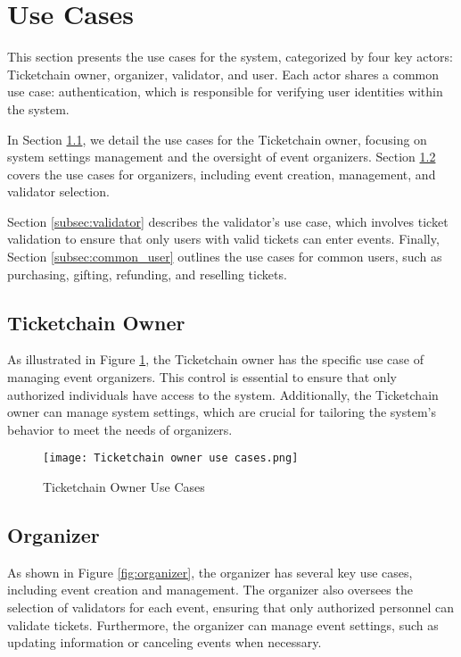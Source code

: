 \section{Use Cases}
\label{sec:use_cases}

This section presents the use cases for the system, categorized by four key
actors: Ticketchain owner, organizer, validator, and user. Each actor shares a
common use case: authentication, which is responsible for verifying user
identities within the system.

In Section \ref{subsec:ticketchain_owner}, we detail the use cases for the
Ticketchain owner, focusing on system settings management and the oversight of
event organizers. Section \ref{subsec:organizer} covers the use cases for
organizers, including event creation, management, and validator selection.

Section \ref{subsec:validator} describes the validator's use case, which
involves ticket validation to ensure that only users with valid tickets can
enter events. Finally, Section \ref{subsec:common_user} outlines the use cases for
common users, such as purchasing, gifting, refunding, and reselling tickets.

\subsection{Ticketchain Owner}
\label{subsec:ticketchain_owner}

As illustrated in Figure \ref{fig:ticketchain_owner_use_cases}, the Ticketchain
owner has the specific use case of managing event organizers. This control is
essential to ensure that only authorized individuals have access to the system.
Additionally, the Ticketchain owner can manage system settings, which are
crucial for tailoring the system’s behavior to meet the needs of organizers.

\begin{figure}[H]
    \centering
    \texttt{[image: Ticketchain owner use cases.png]}
    \caption{Ticketchain Owner Use Cases}
    \label{fig:ticketchain_owner_use_cases}
\end{figure}

\subsection{Organizer}
\label{subsec:organizer}

As shown in Figure \ref{fig:organizer}, the organizer has several key use
cases, including event creation and management. The organizer also oversees the
selection of validators for each event, ensuring that only authorized personnel
can validate tickets. Furthermore, the organizer can manage event settings,
such as updating information or canceling events when necessary.

